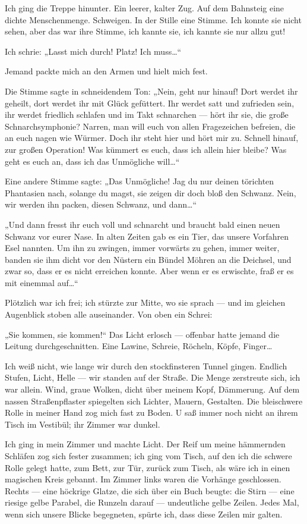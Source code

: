 Ich ging die Treppe hinunter. Ein leerer, kalter Zug. Auf dem
Bahnsteig eine dichte Menschenmenge. Schweigen. In der Stille eine
Stimme. Ich konnte sie nicht sehen, aber das war ihre Stimme, ich
kannte sie, ich kannte sie nur allzu gut!

Ich schrie: „Lasst mich durch! Platz! Ich muss\ldots{}“

Jemand packte mich an den Armen und
hielt mich fest.

Die Stimme sagte in schneidendem Ton: „Nein, geht
nur hinauf! Dort werdet ihr geheilt, dort werdet ihr mit Glück
gefüttert. Ihr werdet satt und zufrieden sein, ihr werdet friedlich
schlafen und im Takt schnarchen — hört ihr sie, die große
Schnarchsymphonie? Narren, man will euch von allen Fragezeichen
befreien, die an euch nagen wie Würmer. Doch ihr steht hier und
hört mir zu. Schnell hinauf, zur großen Operation! Was kümmert es
euch, dass ich allein hier bleibe? Was geht es euch an, dass ich
das Unmögliche will\ldots{}“

Eine andere Stimme sagte:
%
„Das Unmögliche! Jag du nur deinen törichten Phantasien nach,
solange du magst, sie zeigen dir doch bloß den Schwanz. Nein, wir
werden ihn packen, diesen Schwanz, und dann\ldots{}“

„Und dann fresst
ihr euch voll und schnarcht und braucht
bald einen neuen Schwanz vor eurer Nase. In alten Zeiten gab es ein
Tier, das unsere Vorfahren Esel nannten. Um ihn zu zwingen, immer
vorwärts zu gehen, immer weiter, banden sie ihm dicht vor den
Nüstern ein Bündel Möhren an die Deichsel, und zwar so, dass er es
nicht erreichen konnte. Aber wenn er es erwischte, fraß er es mit
einemmal auf\ldots{}“

Plötzlich war ich frei; ich stürzte zur Mitte, wo sie sprach — und
im gleichen Augenblick stoben alle auseinander. Von oben ein
Schrei:

„Sie kommen, sie kommen!“ Das Licht erlosch — offenbar hatte jemand
die Leitung durchgeschnitten. Eine Lawine, Schreie, Röcheln, Köpfe,
Finger\ldots{}

Ich weiß nicht, wie lange wir durch den stockfinsteren
Tunnel gingen. Endlich Stufen, Licht, Helle — wir standen auf der
Straße. Die Menge zerstreute sich, ich war allein. Wind, graue
Wolken, dicht über meinem Kopf, Dämmerung. Auf dem nassen
Straßenpflaster spiegelten sich Lichter, Mauern, Gestalten. Die
bleischwere Rolle in meiner Hand zog mich fast zu Boden. U saß
immer noch nicht an ihrem Tisch im Vestibül; ihr Zimmer war
dunkel.

Ich ging in mein Zimmer und machte Licht. Der Reif um meine
hämmernden Schläfen zog sich fester zusammen; ich ging vom Tisch,
auf den ich die schwere Rolle gelegt hatte, zum Bett, zur Tür,
zurück zum Tisch, als wäre ich in einen magischen Kreis gebannt. Im
Zimmer links waren die Vorhänge geschlossen. Rechts — eine höckrige
Glatze, die sich über ein Buch beugte: die Stirn — eine riesige
gelbe Parabel, die Runzeln darauf — undeutliche gelbe Zeilen. Jedes
Mal, wenn sich unsere Blicke begegneten, spürte ich, dass diese
Zeilen mir galten.

